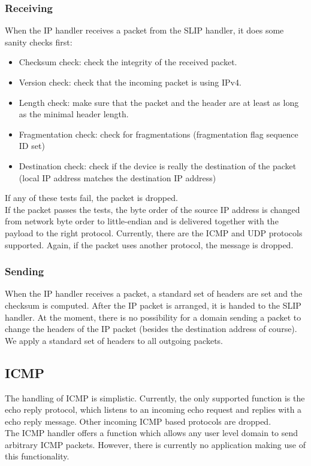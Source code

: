 \subsubsection{Receiving}
When the IP handler receives a packet from the SLIP handler, it does some sanity checks first:
\begin{itemize}
	\item Checksum check: check the integrity of the received packet.
	\item Version check: check that the incoming packet is using IPv4.
	\item Length check: make sure that the packet and the header are at least as long as the minimal header length.
	\item Fragmentation check: check for fragmentations (fragmentation flag sequence ID set)
	\item Destination check: check if the device is really the destination of the packet (local IP address matches the destination IP address)
\end{itemize}
If any of these tests fail, the packet is dropped.\\
If the packet passes the tests, the byte order of the source IP address is changed from network byte order to little-endian and is delivered together with the payload to the right protocol. Currently, there are the ICMP and UDP protocols supported. Again, if the packet uses another protocol, the message is dropped.\\
\subsubsection{Sending}
When the IP handler receives a packet, a standard set of headers are set and the checksum is computed. After the IP packet is arranged, it is handed to the SLIP handler. At the moment, there is no possibility for a domain sending a packet to change the headers of the IP packet (besides the destination address of course). We apply a standard set of headers to all outgoing packets. 

\subsection{ICMP}
The handling of ICMP is simplistic. Currently, the only supported function is the echo reply protocol, which listens to an incoming echo request and replies with a echo reply message. Other incoming ICMP based protocols are dropped.\\
The ICMP handler offers a function which allows any user level domain to send arbitrary ICMP packets. However, there is currently no application making use of this functionality.
\\

